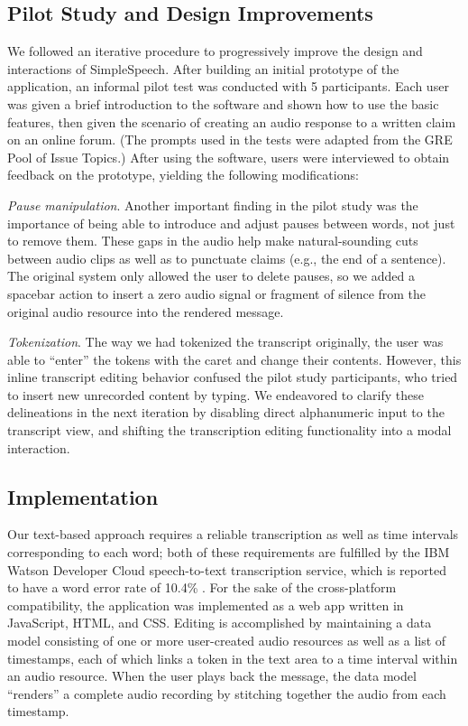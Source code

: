 \subsection{Pilot Study and Design Improvements}
We followed an iterative procedure to progressively improve the design and interactions of SimpleSpeech.
After building an initial prototype of the application, an informal pilot test was conducted with 5 participants. 
Each user was given a brief introduction to the software and shown how to use the basic features, then given the scenario of creating an audio response to a written claim on an online forum. 
(The prompts used in the tests were adapted from the GRE Pool of Issue Topics.) 
After using the software, users were interviewed to obtain feedback on the prototype, yielding the following modifications:

\emph{Pause manipulation}.
Another important finding in the pilot study was the importance of being able to introduce and adjust pauses between words, not just to remove them. 
These gaps in the audio help make natural-sounding cuts between audio clips as well as to punctuate claims (e.g., the end of a sentence). 
The original system only allowed the user to delete pauses, so we added a spacebar action to insert a zero audio signal or fragment of silence from the original audio resource into the rendered message. 

\emph{Tokenization}. 
The way we had tokenized the transcript originally, the user was able to ``enter'' the tokens with the caret and change their contents.
However, this inline transcript editing behavior confused the pilot study participants, who tried to insert new unrecorded content by typing. 
We endeavored to clarify these delineations in the next iteration by disabling direct alphanumeric input to the transcript view, and shifting the transcription editing functionality into a modal interaction.

\subsection{Implementation}
Our text-based approach requires a reliable transcription as well as time intervals corresponding to each word; both of these requirements are fulfilled by the IBM Watson Developer Cloud speech-to-text transcription service, which is reported to have a word error rate of 10.4\% \cite{soltau:2014}.
For the sake of the cross-platform compatibility, the application was implemented as a web app written in JavaScript, HTML, and CSS.
Editing is accomplished by maintaining a data model consisting of one or more user-created audio resources as well as a list of timestamps, each of which links a token in the text area to a time interval within an audio resource. 
When the user plays back the message, the data model ``renders'' a complete audio recording by stitching together the audio from each timestamp. 
